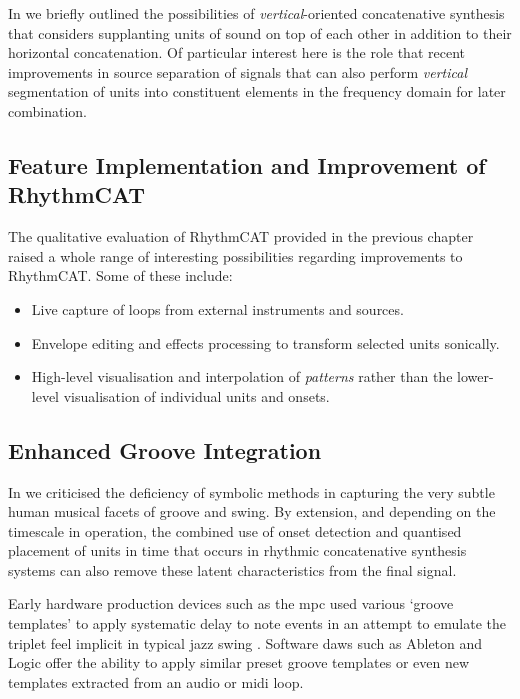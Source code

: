 In  we briefly outlined the possibilities of \textit{vertical}-oriented concatenative synthesis that considers supplanting units of sound on top of each other in addition to their horizontal concatenation. Of particular interest here is the role that recent improvements in source separation of signals that can also perform \textit{vertical} segmentation of units into constituent elements in the frequency domain for later combination.

\subsection{Feature Implementation and Improvement of RhythmCAT}

The qualitative evaluation of RhythmCAT provided in the previous chapter raised a whole range of interesting possibilities regarding improvements to RhythmCAT. Some of these include:

\begin{itemize}
  \item Live capture of loops from external instruments and sources.
  \item Envelope editing and effects processing to transform selected units sonically.
  \item High-level visualisation and interpolation of \textit{patterns} rather than the lower-level visualisation of individual units and onsets.
\end{itemize}

\subsection{Enhanced Groove Integration}

In  we criticised the deficiency of symbolic methods in capturing the very subtle human musical facets of groove and swing. By extension, and depending on the timescale in operation, the combined use of onset detection and quantised placement of units in time that occurs in rhythmic concatenative synthesis systems can also remove these latent characteristics from the final signal.

Early hardware production devices such as the \acrshort{mpc} used various `groove templates' to apply systematic delay to note events in an attempt to emulate the triplet feel implicit in typical jazz swing \citep{Frane2017}. Software \acrshort{daw}s such as Ableton and Logic offer the ability to apply similar preset groove templates or even new templates extracted from an audio or \acrshort{midi} loop. 

